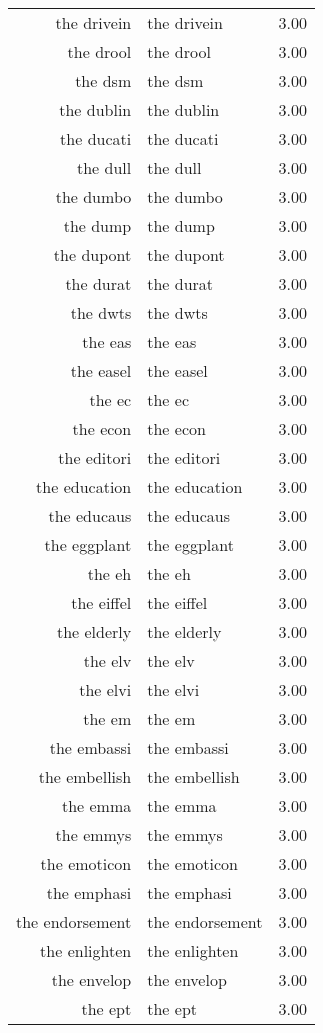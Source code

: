 \begin{table}[ht]
\begin{tabular}{rlr}
  the drivein & the drivein & 3.00 \\ 
  the drool & the drool & 3.00 \\ 
  the dsm & the dsm & 3.00 \\ 
  the dublin & the dublin & 3.00 \\ 
  the ducati & the ducati & 3.00 \\ 
  the dull & the dull & 3.00 \\ 
  the dumbo & the dumbo & 3.00 \\ 
  the dump & the dump & 3.00 \\ 
  the dupont & the dupont & 3.00 \\ 
  the durat & the durat & 3.00 \\ 
  the dwts & the dwts & 3.00 \\ 
  the eas & the eas & 3.00 \\ 
  the easel & the easel & 3.00 \\ 
  the ec & the ec & 3.00 \\ 
  the econ & the econ & 3.00 \\ 
  the editori & the editori & 3.00 \\ 
  the education & the education & 3.00 \\ 
  the educaus & the educaus & 3.00 \\ 
  the eggplant & the eggplant & 3.00 \\ 
  the eh & the eh & 3.00 \\ 
  the eiffel & the eiffel & 3.00 \\ 
  the elderly & the elderly & 3.00 \\ 
  the elv & the elv & 3.00 \\ 
  the elvi & the elvi & 3.00 \\ 
  the em & the em & 3.00 \\ 
  the embassi & the embassi & 3.00 \\ 
  the embellish & the embellish & 3.00 \\ 
  the emma & the emma & 3.00 \\ 
  the emmys & the emmys & 3.00 \\ 
  the emoticon & the emoticon & 3.00 \\ 
  the emphasi & the emphasi & 3.00 \\ 
  the endorsement & the endorsement & 3.00 \\ 
  the enlighten & the enlighten & 3.00 \\ 
  the envelop & the envelop & 3.00 \\ 
  the ept & the ept & 3.00 \\ 

\end{tabular}
\end{table}
